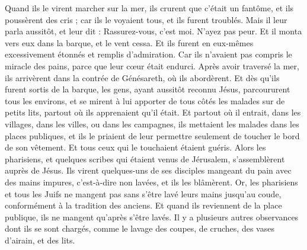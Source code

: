 \begin{multicols}{2}
Quand ils le virent marcher sur la mer, ils crurent que c’était un fantôme, et ils poussèrent des cris ;
car ils le voyaient tous, et ils furent troublés. Mais il leur parla aussitôt, et leur dit : Rassurez-vous, c'est moi. N’ayez pas peur.
Et il monta vers eux dans la barque, et le vent cessa. Et ils furent en eux-mêmes excessivement étonnés et remplis d’admiration.
Car ils n'avaient pas compris le miracle des pains, parce que leur cœur était endurci.
Après avoir traversé la mer, ils arrivèrent dans la contrée de Génésareth, où ils abordèrent.
Et dès qu’ils furent sortis de la barque, les gens, ayant aussitôt reconnu Jésus,
parcoururent tous les environs, et se mirent à lui apporter de tous côtés les malades sur de petits lits, partout où ils apprenaient qu'il était.
Et partout où il entrait, dans les villages, dans les villes, ou dans les campagnes, ils mettaient les malades dans les places publiques, et ils le priaient de leur permettre seulement de toucher le bord de son vêtement. Et tous ceux qui le touchaient étaient guéris.
\VerseOne{}Alors les pharisiens, et quelques scribes qui étaient venus de Jérusalem, s'assemblèrent auprès de Jésus.
Ils virent quelques-uns de ses disciples mangeant du pain avec des mains impures, c'est-à-dire non lavées, et ils les blâmèrent.
Or, les pharisiens et tous les Juifs ne mangent pas sans s’être lavé leurs mains jusqu’au coude, conformément à la tradition des anciens.
Et quand ils reviennent de la place publique, ils ne mangent qu’après s’être lavés{}. Il y a plusieurs autres observances dont ils se sont chargés, comme le lavage des coupes, de cruches, des vases d'airain, et des lits.

\end{multicols}
